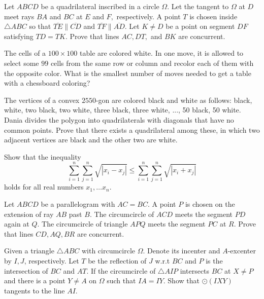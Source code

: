 \documentclass[11pt]{scrartcl}
\begin{document}
\begin{problem}[8851048763094130212]
	Let $ABCD$ be a quadrilateral inscribed in a circle $\Omega.$ Let the tangent to $\Omega$ at $D$ meet rays $BA$ and $BC$ at $E$ and $F,$ respectively. A point $T$ is chosen inside $\triangle ABC$ so that $\overline{TE}\parallel\overline{CD}$ and $\overline{TF}\parallel\overline{AD}.$ Let $K\ne D$ be a point on segment $DF$ satisfying $TD=TK.$ Prove that lines $AC,DT,$ and $BK$ are concurrent.
\end{problem}
\begin{problem}[685138775901874]
The cells of a $100 \times 100$ table are colored white. In one move, it is allowed to select some $99$ cells from the same row or column and recolor each of them with the opposite color. What is the smallest number of moves needed to get a table with a chessboard coloring?
\end{problem}
\begin{problem}[54214990954304]
The vertices of a convex $2550$-gon are colored black and white as follows: black, white, two black, two white, three black, three white, ..., 50 black, 50 white. Dania divides the polygon into quadrilaterals with diagonals that have no common points. Prove that there exists a quadrilateral among these, in which two adjacent vertices are black and the other two are white.
\end{problem}
\begin{problem}[952584318797289]
Show that the inequality\[\sum_{i=1}^n \sum_{j=1}^n \sqrt{|x_i-x_j|}\leqslant \sum_{i=1}^n \sum_{j=1}^n \sqrt{|x_i+x_j|}\]holds for all real numbers $x_1,\ldots x_n.$
\end{problem}
\begin{problem}[4389998719836463980]
Let $ABCD$ be a parallelogram with $AC=BC.$ A point $P$ is chosen on the extension of ray $AB$ past $B.$ The circumcircle of $ACD$ meets the segment $PD$ again at $Q.$ The circumcircle of triangle $APQ$ meets the segment $PC$ at $R.$ Prove that lines $CD,AQ,BR$ are concurrent.
\end{problem}
\begin{problem}[836909183133087]
Given a triangle $ \triangle{ABC} $ with circumcircle $ \Omega $. Denote its incenter and $ A $-excenter by $ I, J $, respectively. Let $ T $ be the reflection of $ J $ w.r.t $ BC $ and $ P $ is the intersection of $ BC $ and $ AT $. If the circumcircle of $ \triangle{AIP} $ intersects $ BC $ at $ X \neq P $ and there is a point $ Y \neq A $ on $ \Omega $ such that $ IA = IY $. Show that $ \odot\left(IXY\right) $ tangents to the line $ AI $.
\end{problem}
\end{document}
